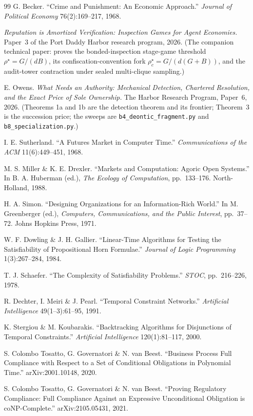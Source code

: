 \documentclass[11pt,a4paper]{article}
\theoremstyle{definition}
\theoremstyle{definition}
\theoremstyle{remark}
\begin{document}
\begin{thebibliography}{99}
 G. Becker. ``Crime and Punishment: An Economic Approach.''
\emph{Journal of Political Economy} 76(2):169--217, 1968.

 \emph{Reputation is Amortized Verification: Inspection Games for
Agent Economies.} Paper~3 of the Port Daddy Harbor research program, 2026. (The
companion technical paper: proves the bonded-inspection stage-game threshold
$\rho^\star = G/(dB)$, its confiscation-convention fork
$\rho^\star_c = G/(d(G{+}B))$, and the audit-tower contraction under sealed
multi-clique sampling.)

 E. Owens. \emph{What Needs an Authority: Mechanical Detection,
Chartered Resolution, and the Exact Price of Sole Ownership.} The Harbor Research
Program, Paper~6, 2026. (Theorems 1a and 1b are the detection theorem and its
frontier; Theorem~3 is the succession price; the sweeps are
\texttt{b4\_deontic\_fragment.py} and \texttt{b8\_specialization.py}.)

 I. E. Sutherland. ``A Futures Market in Computer Time.''
\emph{Communications of the ACM} 11(6):449--451, 1968.

 M. S. Miller \& K. E. Drexler. ``Markets and Computation:
Agoric Open Systems.'' In B. A. Huberman (ed.), \emph{The Ecology of Computation},
pp.~133--176. North-Holland, 1988.

 H. A. Simon. ``Designing Organizations for an Information-Rich
World.'' In M. Greenberger (ed.), \emph{Computers, Communications, and the Public
Interest}, pp.~37--72. Johns Hopkins Press, 1971.

 W. F. Dowling \& J. H. Gallier. ``Linear-Time Algorithms for Testing
the Satisfiability of Propositional Horn Formulae.'' \emph{Journal of Logic
Programming} 1(3):267--284, 1984.

 T. J. Schaefer. ``The Complexity of Satisfiability Problems.''
\emph{STOC}, pp.~216--226, 1978.

 R. Dechter, I. Meiri \& J. Pearl. ``Temporal Constraint Networks.''
\emph{Artificial Intelligence} 49(1--3):61--95, 1991.

 K. Stergiou \& M. Koubarakis. ``Backtracking Algorithms for
Disjunctions of Temporal Constraints.'' \emph{Artificial Intelligence}
120(1):81--117, 2000.

 S. Colombo Tosatto, G. Governatori \& N. van Beest. ``Business
Process Full Compliance with Respect to a Set of Conditional Obligations in
Polynomial Time.'' arXiv:2001.10148, 2020.

 S. Colombo Tosatto, G. Governatori \& N. van Beest. ``Proving
Regulatory Compliance: Full Compliance Against an Expressive Unconditional
Obligation is coNP-Complete.'' arXiv:2105.05431, 2021.

\end{thebibliography}
\end{document}
